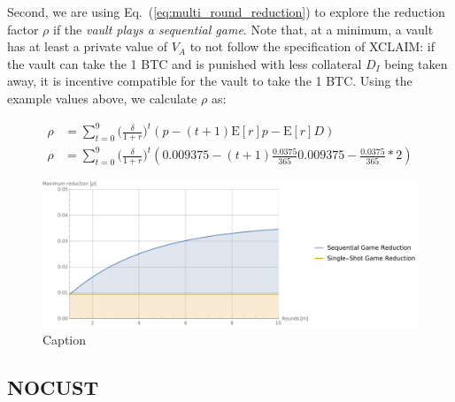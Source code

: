 \documentclass[runningheads]{llncs}
\newcommand{\dom}[1]{\todo[linecolor=green,backgroundcolor=green!25,bordercolor=green,inline,caption={}]{Comment by Dominik: #1}}
\begin{document}
Second, we are using Eq.~(\ref{eq:multi_round_reduction}) to explore the reduction factor $\rho$ if the \textit{vault plays a sequential game}.
Note that, at a minimum, a vault has at least a private value of $V_A$ to not follow the specification of XCLAIM: if the vault can take the 1 BTC and is punished with less collateral $D_I$ being taken away, it is incentive compatible for the vault to take the 1 BTC. Using the example values above, we calculate $\rho$ as:

\begin{equation}
\begin{split}
\rho &= \sum_{t=0}^{9} \big( \frac{\delta}{1+r} \big)^{t} ( p - (t+1)\mathrm{E}[r]p - \mathrm{E}[r]D) \\
\rho &= \sum_{t=0}^{9} \big( \frac{\delta}{1+r} \big)^{t} ( 0.009375 - (t+1)\frac{0.0375}{365}0.009375 - \frac{0.0375}{365}*2)
\end{split}
\end{equation}

\begin{figure}[t]
    \centering
    \includegraphics[width=\textwidth]{promise/figures/collateral-reduction.pdf}
    \caption{Caption}
    \label{fig:collateral}
\end{figure}


\subsection{NOCUST}
\end{document}
